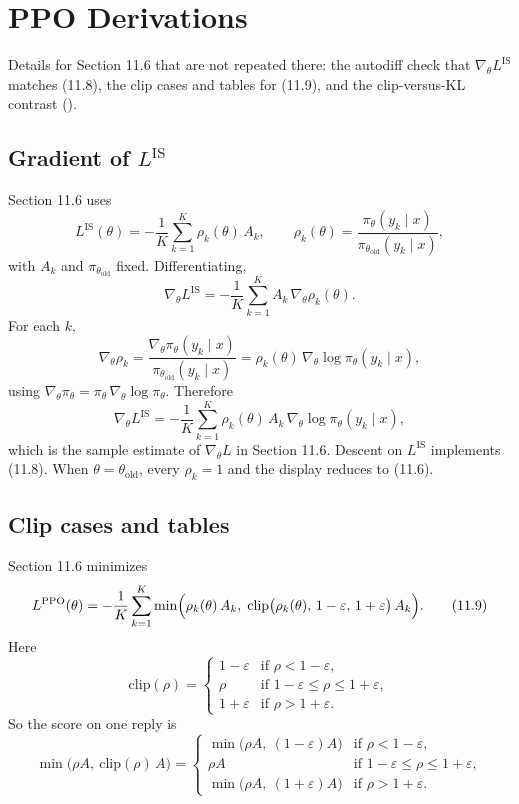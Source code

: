 \chapter{PPO Derivations}\label{app:G}

Details for Section 11.6 that are not repeated there: the autodiff check that $\nabla_\theta L^{\mathrm{IS}}$ matches (11.8), the clip cases and tables for (11.9), and the clip-versus-KL contrast ().

\section{Gradient of $L^{\mathrm{IS}}$}

Section 11.6 uses \[
L^{\mathrm{IS}}(\theta)
=
-\frac{1}{K}\sum_{k=1}^{K}\rho_k(\theta)\,A_k,
\qquad
\rho_k(\theta)
=
\frac{\pi_\theta(y_k\mid x)}{\pi_{\theta_{\mathrm{old}}}(y_k\mid x)},
\] with $A_k$ and $\pi_{\theta_{\mathrm{old}}}$ fixed. Differentiating, \[
\nabla_\theta L^{\mathrm{IS}}
=
-\frac{1}{K}\sum_{k=1}^{K}
A_k\,\nabla_\theta\rho_k(\theta).
\] For each $k$, \[
\nabla_\theta\rho_k
=
\frac{\nabla_\theta\pi_\theta(y_k\mid x)}{\pi_{\theta_{\mathrm{old}}}(y_k\mid x)}
=
\rho_k(\theta)\,\nabla_\theta\log\pi_\theta(y_k\mid x),
\] using $\nabla_\theta\pi_\theta=\pi_\theta\,\nabla_\theta\log\pi_\theta$. Therefore \[
\nabla_\theta L^{\mathrm{IS}}
=
-\frac{1}{K}\sum_{k=1}^{K}
\rho_k(\theta)\,A_k\,
\nabla_\theta\log\pi_\theta(y_k\mid x),
\] which is the sample estimate of $\nabla_\theta L$ in Section 11.6. Descent on $L^{\mathrm{IS}}$ implements (11.8). When $\theta=\theta_{\mathrm{old}}$, every $\rho_k=1$ and the display reduces to (11.6).

\section{Clip cases and tables}\label{app:G.2}

Section 11.6 minimizes \begin{equation}
L^{\mathrm{PPO}}(\theta)
=
-\frac{1}{K}\sum_{k=1}^{K}
\min\Bigl(
\rho_k(\theta)\,A_k,\;
\mathrm{clip}\bigl(\rho_k(\theta),\,1-\varepsilon,\,1+\varepsilon\bigr)\,A_k
\Bigr).
\tag{11.9}
\end{equation} Here \[
\mathrm{clip}(\rho)
=
\begin{cases}
1-\varepsilon & \text{if }\rho<1-\varepsilon,\\
\rho & \text{if }1-\varepsilon\le\rho\le 1+\varepsilon,\\
1+\varepsilon & \text{if }\rho>1+\varepsilon.
\end{cases}
\] So the score on one reply is \[
\min\bigl(\rho A,\ \mathrm{clip}(\rho)\,A\bigr)
=
\begin{cases}
\min\bigl(\rho A,\ (1-\varepsilon)A\bigr) & \text{if }\rho<1-\varepsilon,\\[4pt]
\rho A & \text{if }1-\varepsilon\le\rho\le 1+\varepsilon,\\[4pt]
\min\bigl(\rho A,\ (1+\varepsilon)A\bigr) & \text{if }\rho>1+\varepsilon.
\end{cases}
\]

